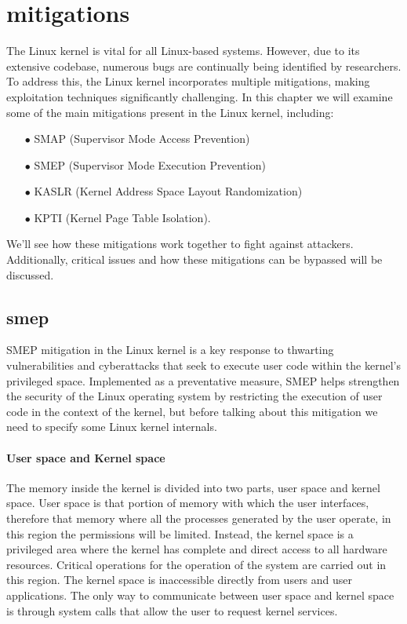 \documentclass{report}
\begin{document}
    \section{mitigations}
    The Linux kernel is vital for all Linux-based systems. However, due to its extensive codebase, numerous bugs are continually being identified by researchers. To address this, the Linux kernel incorporates multiple mitigations, making exploitation techniques significantly challenging.\newline
    In this chapter we will examine some of the main mitigations present in the Linux kernel, including:
    \begin{itemize}
        \item[$\bullet$] SMAP (Supervisor Mode Access Prevention) 
        \item[$\bullet$] SMEP (Supervisor Mode Execution Prevention)
        \item[$\bullet$] KASLR (Kernel Address Space Layout Randomization)   
        \item[$\bullet$] KPTI (Kernel Page Table Isolation).\newline 
    \end{itemize}
    We'll see how these mitigations work together to fight against attackers.\newline
    Additionally, critical issues and how these mitigations can be bypassed will be discussed.\newline
    \subsection{smep}
    SMEP mitigation in the Linux kernel is a key response to thwarting vulnerabilities and cyberattacks that seek to execute user code within the kernel's privileged space. Implemented as a preventative measure, SMEP helps strengthen the security of the Linux operating system by restricting the execution of user code in the context of the kernel, but before talking about this mitigation we need to specify some Linux kernel internals.\newline
    \paragraph{User space and Kernel space}
    The memory inside the kernel is divided into two parts, user space and kernel space.\newline
    User space is that portion of memory with which the user interfaces, therefore that memory where all the processes generated by the user operate, in this region the permissions will be limited.\newline
    Instead, the kernel space is a privileged area where the kernel has complete and direct access to all hardware resources.\newline
    Critical operations for the operation of the system are carried out in this region.\newline
    The kernel space is inaccessible directly from users and user applications.\newline
    The only way to communicate between user space and kernel space is through system calls that allow the user to request kernel services.\newline
    \clearpage
\end{document}
